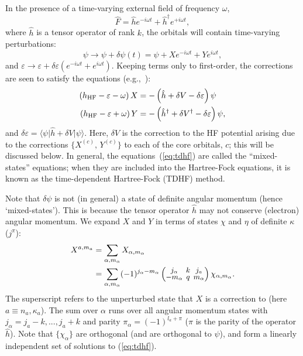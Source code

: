 \documentclass[10pt,twocolumn,a4paper]{article}%
\newcommand{\bra}[1]{\ensuremath{\langle #1|}}	%
\newcommand{\ket}[1]{\ensuremath{|#1\rangle}}	%
\newcommand{\threej}[6]{
\renewcommand\arraystretch{0.75}\setlength\arraycolsep{2pt}
\small\ensuremath{\begin{pmatrix}#1&#2&#3\\#4&#5&#6\end{pmatrix}}
}	%
\newcommand{\be}{\begin{equation}}
\newcommand{\ee}{\end{equation}}
\def\en{\ensuremath{\varepsilon}}
\renewcommand{\a}{\ensuremath{\alpha}}
\renewcommand{\k}{\ensuremath{\kappa}}
\newcommand{\w}{\ensuremath{\omega}}
\begin{document}
In the presence of a time-varying external field of frequency $\omega$,
\be
\hat F = \hat h e^{-i\w t} +  \hat h^\dag e^{+i\w t} ,
\ee
where $\hat h$ is a tensor operator of rank $k$,
 the orbitals will contain time-varying perturbations:
\be\label{eq:tdhf-dPsi}
\psi \to \psi + \delta\psi(t) = \psi +  X e^{- i\w t}+ Y e^{ i\w t},
\ee
and $\en\to\en+\delta\en (e^{- i\w t}+ e^{ i\w t})$.
Keeping terms only to first-order, the corrections are seen to satisfy the equations (e.g.,~\cite{DzubaHFS1984}):
\begin{equation}\begin{split}
\label{eq:tdhf}
\left( h_{\rm HF} - \en -\w \right)X &= -\left(\hat h + \delta V - \delta \en \right)\psi \\
\left( h_{\rm HF} - \en +\w \right)Y &= -\left(\hat h^\dag + \delta V^\dag - \delta \en \right)\psi ,
\end{split}\end{equation}
and $\delta\en = \bra{\psi}\hat h + \delta V\ket{\psi}$.
%
Here, $\delta V$ is the correction to the HF potential arising due to the corrections $\{X^{(c)},\,Y^{(c)}\}$ to each of the core orbitals, $c$; this will be discussed below.
In general, the equations~(\ref{eq:tdhf}) are called the ``mixed-states'' equations; when they are included into the Hartree-Fock equations, it is known as the time-dependent Hartree-Fock (TDHF) method.

Note that $\delta\psi$ is not (in general) a state of definite angular momentum (hence `mixed-states').
This is because the tensor operator $\hat h$ may not conserve (electron) angular momentum.
We expand $X$ and $Y$ in terms of states $\chi$ and $\eta$ of definite $\k$ ($j^\pi$):
\begin{equation}\begin{split}
\label{eq:dPsi-pw}
X^{a,m_a} &= \sum_{\a,m_\a} X_{\a,m_\a}\\
 &= \sum_{\a,m_\a}(-1)^{j_\a-m_\a}\threej{j_\a}{k}{j_a}{-m_\a}{q}{m_\a}\chi_{\a, m_\a}.
\end{split}\end{equation}
The superscript refers to the unperturbed state that $X$ is a correction to (here $a\equiv n_a,\k_a$).
The sum over $\alpha$ runs over all angular momentum states with $j_\alpha = j_a - k, ..., j_a+k$ and parity $\pi_\alpha = (-1)^{l_a + \pi}$ ($\pi$ is the parity of the operator $\hat h$).
Note that $\{\chi_\a\}$ are orthogonal (and are orthogonal to $\psi$), and form a linearly independent set of solutions to (\ref{eq:tdhf}).
\end{document}
